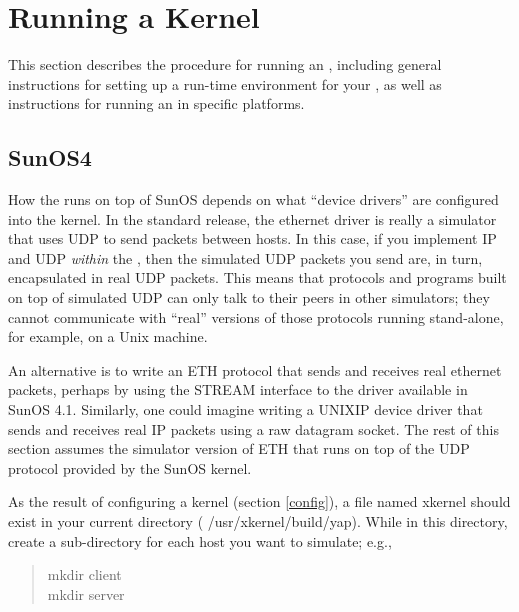 % 
%
%
%
%
%


\section{Running a Kernel}
\label{running}

This section describes the procedure for running an \xk{}, including
general instructions for setting up a 
run-time environment for your \xk{}, as well as instructions for
running an \xk{} in specific platforms.





\subsection{SunOS4}
\label{running_sunos}

How the \xk{} runs on top of SunOS depends on what ``device drivers''
are configured into the kernel. In the standard release, the ethernet
driver is really a simulator that uses UDP to send packets between
hosts. In this case, if you implement IP and UDP {\em within} the
\xk{}, then the simulated UDP packets you send are, in turn, encapsulated
in real UDP packets. This means that protocols and programs built on top
of simulated UDP can only talk to their peers in other simulators; they
cannot communicate with ``real'' versions of those protocols running 
stand-alone, for example, on a Unix machine.  

An alternative is to write an ETH protocol that sends and receives
real ethernet packets, perhaps by using the STREAM interface to the
driver available in SunOS 4.1. Similarly, one could imagine writing a
UNIXIP device driver that sends and receives real IP packets using a
raw datagram socket. The rest of this section assumes the simulator
version of ETH that runs on top of the UDP protocol provided by the
SunOS kernel.

As the result of configuring a kernel (section \ref{config}), a file named
{\sanss xkernel} should exist in your current directory ({\sanss 
/usr/xkernel/build/yap}). While in this directory, create a sub-directory
for each host you want to simulate; e.g.,

\begin{quote}
\begin{tt}
mkdir client\\
mkdir server
\end{tt}
\end{quote}

